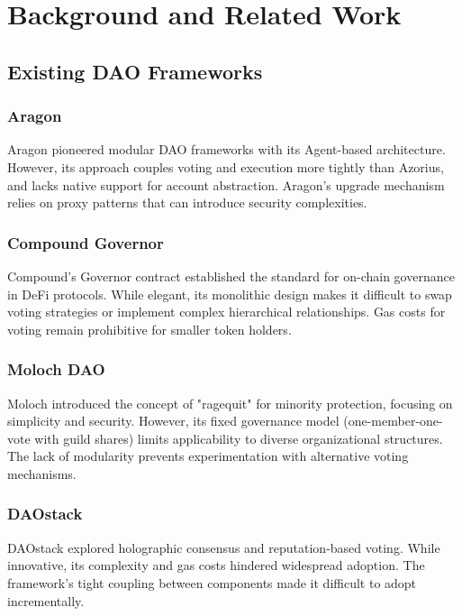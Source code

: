 \section{Background and Related Work}


\subsection{Existing DAO Frameworks}

\subsubsection{Aragon}

Aragon \cite{aragon} pioneered modular DAO frameworks with its Agent-based architecture. However, its approach couples voting and execution more tightly than Azorius, and lacks native support for account abstraction. Aragon's upgrade mechanism relies on proxy patterns that can introduce security complexities.

\subsubsection{Compound Governor}

Compound's Governor contract \cite{compound} established the standard for on-chain governance in DeFi protocols. While elegant, its monolithic design makes it difficult to swap voting strategies or implement complex hierarchical relationships. Gas costs for voting remain prohibitive for smaller token holders.

\subsubsection{Moloch DAO}

Moloch \cite{moloch} introduced the concept of "ragequit" for minority protection, focusing on simplicity and security. However, its fixed governance model (one-member-one-vote with guild shares) limits applicability to diverse organizational structures. The lack of modularity prevents experimentation with alternative voting mechanisms.

\subsubsection{DAOstack}

DAOstack \cite{daostack} explored holographic consensus and reputation-based voting. While innovative, its complexity and gas costs hindered widespread adoption. The framework's tight coupling between components made it difficult to adopt incrementally.

